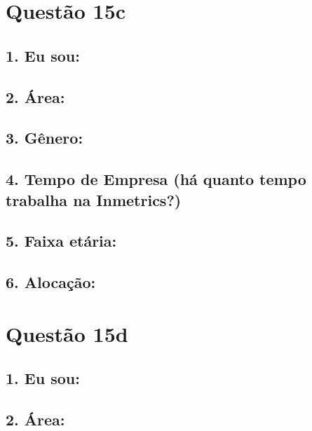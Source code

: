 \documentclass[]{book}
\begin{document}
\hypertarget{questao-15c}{%
\section{Questão 15c}\label{questao-15c}}

\hypertarget{eu-sou-25}{%
\subsection{1. Eu sou:}\label{eu-sou-25}}

\hypertarget{area-25}{%
\subsection{2. Área:}\label{area-25}}

\hypertarget{genero-25}{%
\subsection{3. Gênero:}\label{genero-25}}

\hypertarget{tempo-de-empresa-ha-quanto-tempo-trabalha-na-inmetrics-25}{%
\subsection{4. Tempo de Empresa (há quanto tempo trabalha na Inmetrics?)}\label{tempo-de-empresa-ha-quanto-tempo-trabalha-na-inmetrics-25}}

\hypertarget{faixa-etaria-25}{%
\subsection{5. Faixa etária:}\label{faixa-etaria-25}}

\hypertarget{alocacao-25}{%
\subsection{6. Alocação:}\label{alocacao-25}}

\hypertarget{questao-15d}{%
\section{Questão 15d}\label{questao-15d}}

\hypertarget{eu-sou-26}{%
\subsection{1. Eu sou:}\label{eu-sou-26}}

\hypertarget{area-26}{%
\subsection{2. Área:}\label{area-26}}
\end{document}
